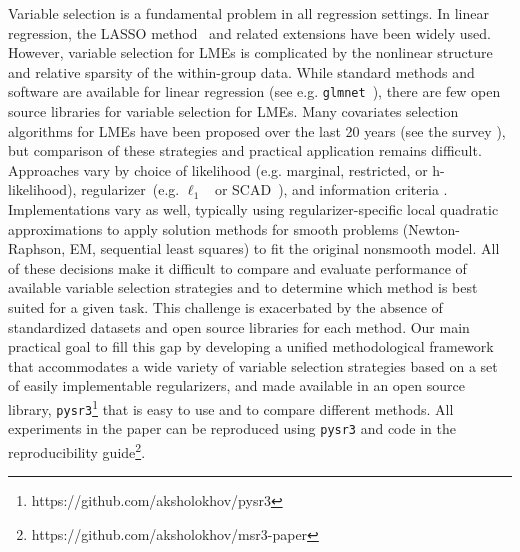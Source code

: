 Variable selection is a fundamental problem in all regression settings. In linear regression, the LASSO method~\citep{tibshirani1996regression} and related extensions have been widely used. %
However, variable selection for LMEs is complicated by the nonlinear structure and relative sparsity of the within-group data. 
While standard methods and software are available for linear regression (see e.g. \texttt{glmnet}~\cite{glmnet}), there are few open source libraries for variable selection 
for LMEs. 
Many covariates selection algorithms for LMEs have been proposed over the last 20 years (see the survey \cite{Buscemi2019Survey}), but comparison of 
these strategies and practical application remains difficult. %
Approaches vary by choice of likelihood (e.g. marginal, restricted, or h- likelihood),  
regularizer~(e.g. $\ell_1$~\citep{Krishna2008} or SCAD~\cite{ibrahim2011fixed}), and information criteria \citep{Vaida2005,Ibrahim2011}. 
Implementations vary as well, typically using regularizer-specific local quadratic approximations to apply
solution methods for smooth problems (Newton-Raphson, EM, sequential least squares) to fit the original nonsmooth model. 
All of these decisions make it  difficult to compare and evaluate performance of available 
variable selection strategies and to determine which method is best suited for a given task. 
This challenge  is exacerbated by the absence of standardized datasets 
and open source libraries for each method. 
Our main practical goal to fill this gap by developing a unified methodological framework that
accommodates a wide variety of variable selection strategies based on a set
of easily implementable regularizers, and 
made available in an open source library, \texttt{pysr3}\footnote{https://github.com/aksholokhov/pysr3} that is 
easy to use and to compare different methods. All experiments in the paper can be reproduced 
using \texttt{pysr3} and code in the reproducibility guide\footnote{https://github.com/aksholokhov/msr3-paper}.

